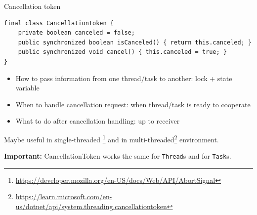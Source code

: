 \begin{frame}[fragile]{Cancellation token}

\begin{verbatim}
final class CancellationToken {
    private boolean canceled = false;
    public synchronized boolean isCanceled() { return this.canceled; }
    public synchronized void cancel() { this.canceled = true; }
}
\end{verbatim}

\pause

\begin{itemize}
    \item How to pass information from one thread/task to another: lock + state variable
    \item When to handle cancellation request: when thread/task is ready to cooperate
    \item What to do after cancellation handling: up to receiver
\end{itemize}

\pause

Maybe useful in single-threaded \footnote<3->{\tiny\url{https://developer.mozilla.org/en-US/docs/Web/API/AbortSignal}} and in multi-threaded\footnote<3->{\tiny\url{https://learn.microsoft.com/en-us/dotnet/api/system.threading.cancellationtoken}} environment.

\pause

\textbf{Important:} CancellationToken works the same for \texttt{Thread}s and for \texttt{Task}s.

\end{frame}

